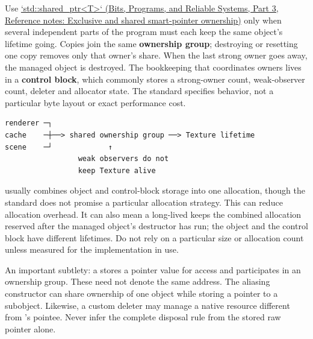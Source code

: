 \hypertarget{05-engine-i-ch004-shared-ownership-one-object-a-group-of-owners-and-a-separate-control-block}{}

Use \href{../01-Bits-Programs-and-Reliable-Systems-P03/main.pdf\#appendix-51602cabe815}{`std::shared\_ptr\textless T\textgreater` (Bits, Programs, and Reliable Systems, Part 3, Reference notes: Exclusive and shared smart-pointer ownership)} only when several independent parts of the program must each keep the same object's lifetime going. Copies join the same \textbf{ownership group}; destroying or resetting one copy removes only that owner's share. When the last strong owner goes away, the managed object is destroyed. The bookkeeping that coordinates owners lives in a \textbf{control block}, which commonly stores a strong-owner count, weak-observer count, deleter and allocator state. The standard specifies behavior, not a particular byte layout or exact performance cost.

\begin{verbatim}
renderer ─┐
cache    ─┼──> shared ownership group ──> Texture lifetime
scene    ─┘             ↑
                 weak observers do not
                 keep Texture alive
\end{verbatim}

 usually combines object and control-block storage into one allocation, though the standard does not promise a particular allocation strategy. This can reduce allocation overhead. It can also mean a long-lived  keeps the combined allocation reserved after the managed object's destructor has run; the object and the control block have different lifetimes. Do not rely on a particular size or allocation count unless measured for the implementation in use.

An important subtlety: a  stores a pointer value for access and participates in an ownership group. These need not denote the same address. The aliasing constructor can share ownership of one object while storing a pointer to a subobject. Likewise, a custom deleter may manage a native resource different from 's pointee. Never infer the complete disposal rule from the stored raw pointer alone.


